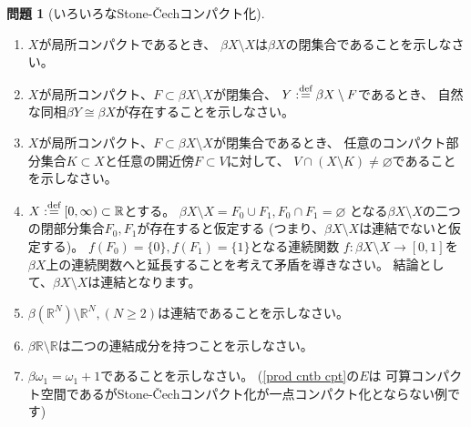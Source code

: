 \documentclass[uplatex]{jsarticle}
\theoremstyle{definition}
\newtheorem{prob}[prob]{問題}
\renewcommand{\emptyset}{\varnothing}
\newcommand{\dfn}{:\overset{\mbox{{\scriptsize def}}}{=}}
\newcommand{\R}{\mathbb{R}}
\begin{document}
\begin{prob}[いろいろなStone-\v{C}echコンパクト化]
  \
  \begin{enumerate}
    \item
    \(X\)が局所コンパクトであるとき、
    \(\beta X\setminus X\)は\(\beta X\)の閉集合であることを示しなさい。
    \item
    \(X\)が局所コンパクト、\(F\subset \beta X \setminus X\)が閉集合、
    \(Y\dfn \beta X \setminus F\)であるとき、
    自然な同相\(\beta Y \cong \beta X\)が存在することを示しなさい。
    \item
    \(X\)が局所コンパクト、\(F\subset \beta X \setminus X\)が閉集合であるとき、
    任意のコンパクト部分集合\(K\subset X\)と任意の開近傍\(F\subset V\)に対して、
    \(V\cap (X\setminus K) \neq \emptyset\)であることを示しなさい。
    \item
    \(X\dfn [0,\infty)\subset \R\)とする。
    \(\beta X \setminus X = F_0\cup F_1, F_0\cap F_1 = \emptyset\)
    となる\(\beta X \setminus X\)の二つの閉部分集合\(F_0,F_1\)が存在すると仮定する
    (つまり、\(\beta X \setminus X\)は連結でないと仮定する)。
    \(f(F_0) = \{0\}, f(F_1) = \{1\}\)となる連続関数
    \(f:\beta X \setminus X\to [0,1]\)を
    \(\beta X\)上の連続関数へと延長することを考えて矛盾を導きなさい。
    結論として、\(\beta X \setminus X\)は連結となります。
    \item
    \(\beta (\R^N) \setminus \R^N, (N\geq 2)\)は連結であることを示しなさい。
    \item
    \(\beta \R \setminus \R\)は二つの連結成分を持つことを示しなさい。
    \item
    \(\beta \omega_1 = \omega_1 + 1\)であることを示しなさい。
    (\autoref{prod cntb cpt}の\(E\)は
    可算コンパクト空間であるがStone-\v{C}echコンパクト化が一点コンパクト化とならない例です)
  \end{enumerate}
\end{prob}
\end{document}
